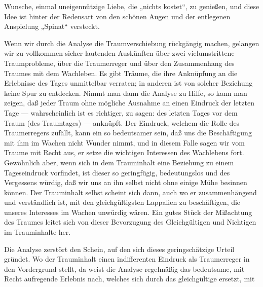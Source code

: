 \documentclass{article}
\begin{document}
         
            
            
            
        \pstart
        Wunsche, einmal uneigennützige Liebe, die „nichts kostet“, zu
               genießen, und diese Idee ist hinter der Redensart von den schönen Augen und der
               entlegenen Anspielung „Spinat“ versteckt.
        \pend
    
            
        \pstart
        Wenn wir durch die Analyse die Traumverschiebung rückgängig machen,
               gelangen wir zu vollkommen sicher lautenden Auskünften über zwei vielumstrittene
               Traumprobleme, über die Traumerreger und über den Zusammenhang des Traumes
               mit dem Wachleben. Es gibt Träume, die ihre Anknüpfung an die Erlebnisse
               des Tages unmittelbar verraten; in anderen ist von solcher Beziehung keine Spur
               zu entdecken. Nimmt man dann die Analyse zu Hilfe, so kann man zeigen, daß jeder
               Traum ohne mögliche Ausnahme an einen Eindruck der letzten Tage —
               wahrscheinlich ist es richtiger, zu sagen: des letzten Tages vor dem Traum (des
               Traumtages) — anknüpft. Der Eindruck, welchem die Rolle des Traumerregers
               zufällt, kann ein so bedeutsamer sein, daß uns die Beschäftigung mit ihm im
               Wachen nicht Wunder nimmt, und in diesem Falle sagen wir vom Traume mit
               Recht aus, er setze die wichtigen Interessen des Wachlebens fort. Gewöhnlich
               aber, wenn sich in dem Trauminhalt eine Beziehung zu einem Tageseindruck
               vorfindet, ist dieser so geringfügig, bedeutungslos und des
               Vergessens würdig, daß wir uns an ihn selbst nicht ohne einige Mühe besinnen
               können. Der Trauminhalt selbst scheint sich dann, auch wo er
               zusammenhängend und verständlich ist, mit den gleichgültigsten Lappalien zu
               beschäftigen, die unseres Interesses im Wachen unwürdig wären. Ein gutes Stück
               der Mißachtung des Traumes leitet sich von dieser Bevorzugung des Gleichgültigen
               und Nichtigen im Trauminhalte her.
        \pend
    
            
        \pstart
        Die Analyse zerstört den Schein, auf den sich dieses geringschätzige
               Urteil gründet. Wo der Trauminhalt einen indifferenten Eindruck als Traumerreger
               in den Vordergrund stellt, da weist die Analyse regelmäßig das bedeutsame, mit
               Recht aufregende Erlebnis nach, welches sich durch das gleichgültige ersetzt,
               mit
        \pend
    
\end{document}

